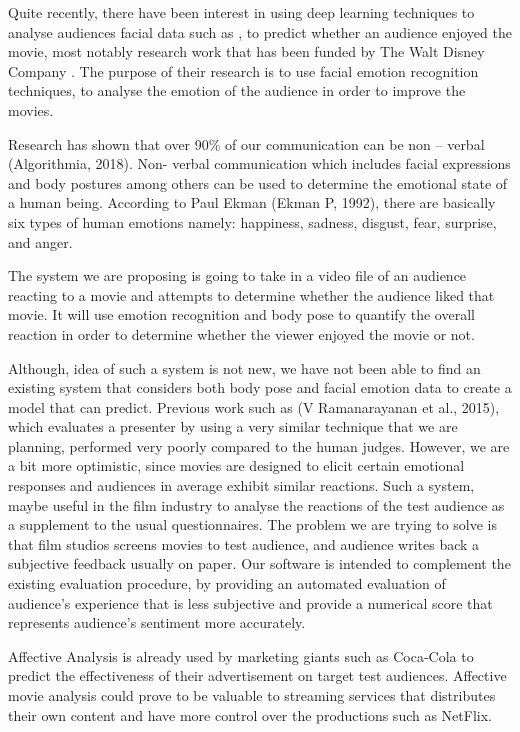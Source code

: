 \documentclass[12pt,a4paper,man]{report}
\begin{document}
Quite recently, there have been interest in using deep learning techniques to analyse audiences facial data such as \cite{saha2018unsupervised}, to predict whether an audience enjoyed the movie, most notably research work that has been funded by The Walt Disney Company \cite{Deng_2017}. The purpose of their research is to use facial emotion recognition techniques, to analyse the emotion of the audience in order to improve the movies.

Research has shown that over 90\% of our communication can be non – verbal (Algorithmia, 2018). Non- verbal communication which includes facial expressions and body postures among others can be used to determine the emotional state of a human being. According to Paul Ekman (Ekman P, 1992), there are basically six types of human emotions namely:  happiness, sadness, disgust, fear, surprise, and anger. 

The system we are proposing is going to take in a video file of an audience reacting to a movie and attempts to determine whether the audience liked that movie. It will use emotion recognition and body pose to quantify the overall reaction in order to determine whether the viewer enjoyed the movie or not. 

Although, idea of such a system is not new, we have not been able to find an existing system that considers both body pose and facial emotion data to create a model that can predict. Previous work such as (V Ramanarayanan et al., 2015), which evaluates a presenter by using a very similar technique that we are planning, performed very poorly compared to the human judges. However, we are a bit more optimistic, since movies are designed to elicit certain emotional responses and audiences in average exhibit similar reactions. Such a system, maybe useful in the film industry to analyse the reactions of the test audience as a supplement to the usual questionnaires. 
The problem we are trying to solve is that film studios screens movies to test audience, and audience writes back a subjective feedback usually on paper. Our software is intended to complement the existing evaluation procedure, by providing an automated evaluation of audience's experience that is less subjective and provide a numerical score that represents audience's sentiment more accurately.

Affective Analysis is already used by marketing giants such as Coca-Cola to predict the effectiveness of their advertisement on target test audiences. Affective movie analysis could prove to be valuable to streaming services that distributes their own content and have more control over the productions such as NetFlix.
\end{document}
